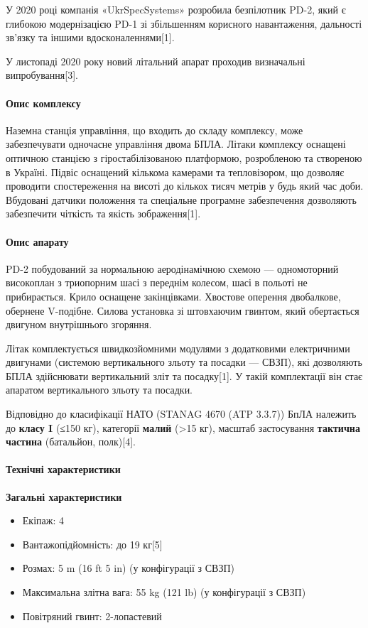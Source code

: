 У 2020 році компанія «UkrSpecSystems» розробила безпілотник PD-2, який є
глибокою модернізацією PD-1 зі збільшенням корисного навантаження, дальності
зв'язку та іншими вдосконаленнями[1].

У листопаді 2020 року новий літальний апарат проходив визначальні
випробування[3]. 

\paragraph{Опис комплексу}

Наземна станція управління, що входить до складу комплексу, може забезпечувати
одночасне управління двома БПЛА. Літаки комплексу оснащені оптичною станцією з
гіростабілізованою платформою, розробленою та створеною в Україні. Підвіс
оснащений кількома камерами та тепловізором, що дозволяє проводити
спостереження на висоті до кількох тисяч метрів у будь який час доби. Вбудовані
датчики положення та спеціальне програмне забезпечення дозволяють забезпечити
чіткість та якість зображення[1]. 

\paragraph{Опис апарату}

PD-2 побудований за нормальною аеродінамічною схемою — одномоторний високоплан
з триопорним шасі з переднім колесом, шасі в польоті не прибирається. Крило
оснащене закінцівками. Хвостове оперення двобалкове, обернене V-подібне. Силова
установка зі штовхаючим гвинтом, який обертається двигуном внутрішнього
згоряння.

Літак комплектується швидкозйомними модулями з додатковими електричними
двигунами (системою вертикального зльоту та посадки — СВЗП), які дозволяють
БПЛА здійснювати вертикальний зліт та посадку[1]. У такій комплектації він стає
апаратом вертикального зльоту та посадки.

Відповідно до класифікації НАТО (STANAG 4670 (ATP 3.3.7)) БпЛА належить до
\textbf{класу I} (≤150 кг), категорії \textbf{малий} (>15 кг), масштаб
застосування \textendash \textbf{тактична частина} (батальйон, полк)[4].

\paragraph{Технічні характеристики}

\textbf{Загальні характеристики}

\begin{itemize}
  \item Екіпаж: 4
  \item Вантажопідйомність: до 19 кг[5]
  \item Розмах: 5 m (16 ft 5 in) (у конфігурації з СВЗП)
  \item Максимальна злітна вага: 55 kg (121 lb) (у конфігурації з СВЗП)
  \item Повітряний гвинт: 2-лопастевий
\end{itemize}

